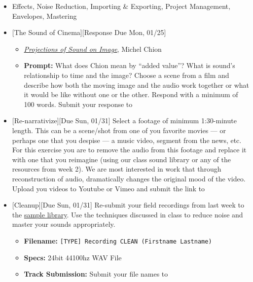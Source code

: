 \def\dMon{Mon, 01/25}
\def\dTues{Tues, 01/26}
\def\dWed{Wed, 01/27}
\def\dThur{Thur, 01/28}
\def\dFri{Fri, 01/29}
\def\dSat{Sat, 01/30}
\def\dSun{Sun, 01/31}
\placeDate

\begin{itemize}[noitemsep,topsep=0pt,leftmargin=*]
	\item {} Effects, Noise Reduction, Importing \& Exporting, Project Management, Envelopes, Mastering
	\item {}[The Sound of Cinema][Response Due \dMon]
	      \begin{itemize}
		      \item \href{supplements/MICHEL_CHION_PROJECTIONS_OF_SOUND_ON_IMAGE.pdf}{\emph{Projections of Sound on Image}}, Michel Chion
		      \item \textbf{Prompt:} What does Chion mean by ``added value''? What is sound's relationship to time and the image? Choose a scene from a film and describe how both the moving image and the audio work together or what it would be like without one or the other. Respond with a minimum of 100 words. Submit your response to \discordR
	      \end{itemize}
	\item {}[Re-narrativize][Due \dSun] \newline
	      Select a footage of minimum 1:30-minute length. This can be a scene/shot from one of you favorite movies --- or perhaps one that you despise --- a music video, segment from the news, etc. For this exercise you are to remove the audio from this footage and replace it with one that you reimagine (using our class sound library or any of the resources from week 2). We are most interested in work that through reconstruction of audio, dramatically changes the original mood of the video. Upload you videos to Youtube or Vimeo and submit the link to \discordE
	\item {}[Cleanup][Due \dSun] \newline
	      Re-submit your field recordings from last week to the \href{\samplelibPermURL}{sample library}. Use the techniques discussed in class to reduce noise and master your sounds appropriately.
	      \begin{itemize}
		      \item \textbf{Filename:} \texttt{[TYPE] Recording CLEAN (Firstname Lastname)}
		      \item \textbf{Specs:} 24bit 44100hz WAV File
		      \item \textbf{Track Submission:} Submit your file names to \discordS

\end{itemize}
\end{itemize}
